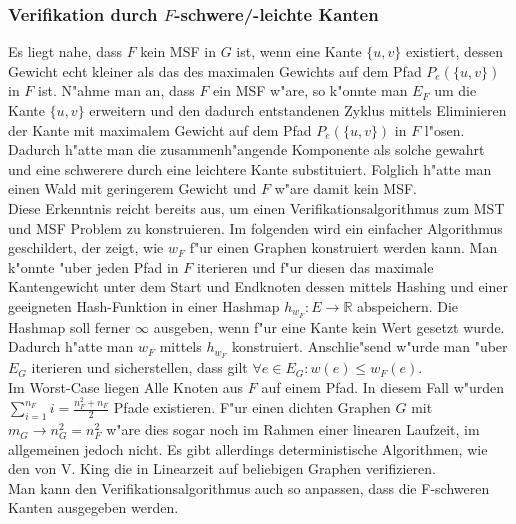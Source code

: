 \subsubsection{Verifikation durch $F$-schwere/-leichte Kanten}
\label{sec:verification}
Es liegt nahe, dass $F$ kein MSF in $G$ ist, wenn eine Kante $\{u,v\}$ 
    existiert, dessen Gewicht echt kleiner als das des maximalen Gewichts auf dem
    Pfad $P_e(\{u,v\})$ in $F$ ist. 
    N"ahme man an, dass $F$ ein MSF w"are, 
    so k"onnte man $E_F$ um die Kante $\{u,v\}$ erweitern und den dadurch 
    entstandenen Zyklus mittels Eliminieren der Kante mit maximalem Gewicht auf dem
    Pfad $P_e(\{u,v\})$ in $F$ l"osen. Dadurch h"atte man die zusammenh"angende 
    Komponente als solche gewahrt und eine schwerere durch eine leichtere Kante
    substituiert. Folglich h"atte man einen Wald mit geringerem Gewicht
    und $F$ w"are damit kein MSF.\\
Diese Erkenntnis reicht bereits aus, um einen Verifikationsalgorithmus zum 
    MST und MSF Problem zu konstruieren.
    Im folgenden wird ein einfacher Algorithmus geschildert, 
    der zeigt, wie $w_F$ f"ur einen
    Graphen konstruiert werden kann.
    Man k"onnte "uber jeden Pfad in $F$ iterieren und f"ur diesen 
    das maximale Kantengewicht unter dem Start und Endknoten dessen mittels
    Hashing und einer geeigneten Hash-Funktion in einer Hashmap 
    $h_{w_F} : E \rightarrow \mathbb{R}$ abspeichern.
    Die Hashmap soll ferner $\infty$ ausgeben, wenn f"ur eine Kante kein Wert 
    gesetzt wurde.
    Dadurch h"atte man $w_F$ mittels $h_{w_F}$ konstruiert.
    Anschlie"send w"urde man "uber $E_G$ iterieren und sicherstellen, dass gilt
    $\forall e \in E_G: w(e) \leq w_F(e)$.\\
    Im Worst-Case liegen Alle Knoten aus $F$ auf einem Pfad.
    In diesem Fall w"urden $\sum_{i=1}^{n_F} i = \frac{n_F^2+n_F}{2}$ Pfade existieren.
    F"ur einen dichten Graphen $G$ mit $m_G \rightarrow n_G^2 = n_F^2$ w"are dies sogar noch im Rahmen 
    einer linearen Laufzeit, im allgemeinen jedoch nicht.
    Es gibt allerdings deterministische Algorithmen, wie den von V. King 
    \cite{simpleVer}
    die in Linearzeit auf beliebigen Graphen verifizieren.\\
Man kann den Verifikationsalgorithmus auch so anpassen, dass die F-schweren Kanten
    ausgegeben werden.\\
